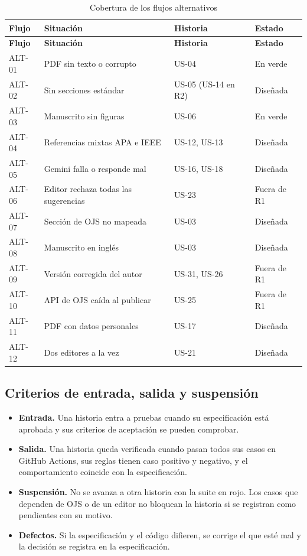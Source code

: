 {\small
\begin{longtable}{@{}>{\raggedright\arraybackslash}p{}>{\raggedright\arraybackslash}p{}>{\raggedright\arraybackslash}p{}>{\raggedright\arraybackslash}p{}@{}}
\caption{Cobertura de los flujos alternativos}\label{tab:3-14}\\
\toprule
\textbf{Flujo} & \textbf{Situación} & \textbf{Historia} & \textbf{Estado} \\
\midrule
\endfirsthead
\toprule
\textbf{Flujo} & \textbf{Situación} & \textbf{Historia} & \textbf{Estado} \\
\midrule
\endhead
\bottomrule
\endfoot
\endlastfoot
ALT-01 & PDF sin texto o corrupto & US-04 & En verde \\
ALT-02 & Sin secciones estándar & US-05 (US-14 en R2) & Diseñada \\
ALT-03 & Manuscrito sin figuras & US-06 & En verde \\
ALT-04 & Referencias mixtas APA e IEEE & US-12, US-13 & Diseñada \\
ALT-05 & Gemini falla o responde mal & US-16, US-18 & Diseñada \\
ALT-06 & Editor rechaza todas las sugerencias & US-23 & Fuera de R1 \\
ALT-07 & Sección de OJS no mapeada & US-03 & Diseñada \\
ALT-08 & Manuscrito en inglés & US-03 & Diseñada \\
ALT-09 & Versión corregida del autor & US-31, US-26 & Fuera de R1 \\
ALT-10 & API de OJS caída al publicar & US-25 & Fuera de R1 \\
ALT-11 & PDF con datos personales & US-17 & Diseñada \\
ALT-12 & Dos editores a la vez & US-21 & Diseñada \\
\end{longtable}
}

\subsection{Criterios de entrada, salida y suspensión}

\begin{itemize}
  \item \textbf{Entrada.} Una historia entra a pruebas cuando su especificación está aprobada y sus criterios de aceptación se pueden comprobar.
  \item \textbf{Salida.} Una historia queda verificada cuando pasan todos sus casos en GitHub Actions, sus reglas tienen caso positivo y negativo, y el comportamiento coincide con la especificación.
  \item \textbf{Suspensión.} No se avanza a otra historia con la suite en rojo. Los casos que dependen de OJS o de un editor no bloquean la historia si se registran como pendientes con su motivo.
  \item \textbf{Defectos.} Si la especificación y el código difieren, se corrige el que esté mal y la decisión se registra en la especificación.
\end{itemize}

